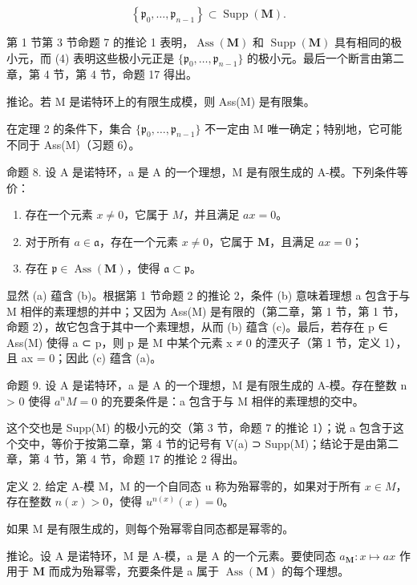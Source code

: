 \[
\left\{\mathfrak {p} _ {0}, \dots , \mathfrak {p} _ {n - 1} \right\} \subset \operatorname{Supp} (\mathbf {M}).
\]

第 1 节第 3 节命题 7 的推论 1 表明，\(\operatorname{Ass}(\mathbf{M})\) 和 \(\operatorname{Supp}(\mathbf{M})\) 具有相同的极小元，而 (4) 表明这些极小元正是 \(\{\mathfrak{p}_0, \ldots, \mathfrak{p}_{n-1}\}\) 的极小元。最后一个断言由第二章，第 4 节，第 4 节，命题 17 得出。

推论。若 M 是诺特环上的有限生成模，则 Ass(M) 是有限集。

在定理 2 的条件下，集合 \(\{\mathfrak{p}_0,\ldots ,\mathfrak{p}_{n - 1}\}\) 不一定由 M 唯一确定；特别地，它可能不同于 Ass(M)（习题 6）。

命题 8. 设 A 是诺特环，a 是 A 的一个理想，M 是有限生成的 A-模。下列条件等价：

\begin{enumerate}
\def\labelenumi{(\alph{enumi})}
\item
存在一个元素 \(x \neq 0\)，它属于 \(M\)，并且满足 \(ax = 0\)。
\item
对于所有 \(a \in \mathfrak{a}\)，存在一个元素 \(x \neq 0\)，它属于 \(\mathbf{M}\)，且满足 \(ax = 0\)；
\item
  存在 \(\mathfrak{p} \in \operatorname{Ass}(\mathbf{M})\)，使得 \(\mathfrak{a} \subset \mathfrak{p}\)。
\end{enumerate}

显然 (a) 蕴含 (b)。根据第 1 节命题 2 的推论 2，条件 (b) 意味着理想 a 包含于与 M 相伴的素理想的并中；又因为 Ass(M) 是有限的（第二章，第 1 节，第 1 节，命题 2），故它包含于其中一个素理想，从而 (b) 蕴含 (c)。最后，若存在 p ∈ Ass(M) 使得 a ⊂ p，则 p 是 M 中某个元素 x ≠ 0 的湮灭子（第 1 节，定义 1），且 ax = 0；因此 (c) 蕴含 (a)。

命题 9. 设 A 是诺特环，a 是 A 的一个理想，M 是有限生成的 A-模。存在整数 n \textgreater{} 0 使得 \(a^{n}M = 0\) 的充要条件是：a 包含于与 M 相伴的素理想的交中。

这个交也是 Supp(M) 的极小元的交（第 3 节，命题 7 的推论 1）；说 a 包含于这个交中，等价于按第二章，第 4 节的记号有 V(a) ⊃ Supp(M)；结论于是由第二章，第 4 节，第 4 节，命题 17 的推论 2 得出。

定义 2. 给定 A-模 M，M 的一个自同态 u 称为殆幂零的，如果对于所有 \(x \in M\)，存在整数 \(n(x) > 0\)，使得 \(u^{n(x)}(x) = 0\)。

如果 M 是有限生成的，则每个殆幂零自同态都是幂零的。

推论。设 A 是诺特环，M 是 A-模，a 是 A 的一个元素。要使同态 \(a_{\mathbf{M}}: x \mapsto ax\) 作用于 \(\mathbf{M}\) 而成为殆幂零，充要条件是 a 属于 \(\operatorname{Ass}(\mathbf{M})\) 的每个理想。

